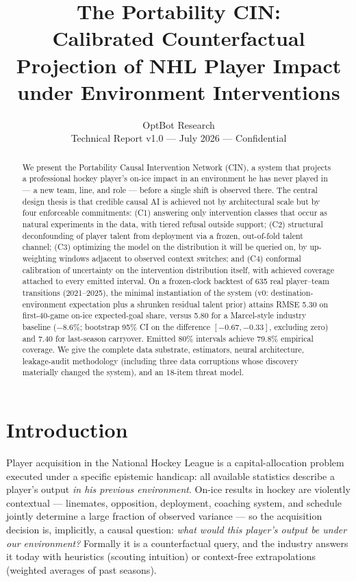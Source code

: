 \documentclass[11pt]{article}
\title{\textbf{The Portability CIN:\\ Calibrated Counterfactual Projection of NHL Player Impact\\ under Environment Interventions}}
\author{OptBot Research \\ \small Technical Report v1.0 --- July 2026 --- Confidential}
\date{}
\begin{document}
\maketitle

\begin{abstract}
\noindent We present the Portability Causal Intervention Network (CIN), a system that projects
a professional hockey player's on-ice impact in an environment he has never played in ---
a new team, line, and role --- before a single shift is observed there. The central design
thesis is that credible causal AI is achieved not by architectural scale but by four
enforceable commitments: (C1) answering only intervention classes that occur as natural
experiments in the data, with tiered refusal outside support; (C2) structural deconfounding
of player talent from deployment via a frozen, out-of-fold talent channel; (C3) optimizing
the model on the distribution it will be queried on, by up-weighting windows adjacent to
observed context switches; and (C4) conformal calibration of uncertainty on the intervention
distribution itself, with achieved coverage attached to every emitted interval. On a
frozen-clock backtest of 635 real player--team transitions (2021--2025), the minimal
instantiation of the system (v0: destination-environment expectation plus a shrunken
residual talent prior) attains RMSE 5.30 on first-40-game on-ice expected-goal share,
versus 5.80 for a Marcel-style industry baseline ($-8.6\%$; bootstrap 95\% CI on the
difference $[-0.67, -0.33]$, excluding zero) and 7.40 for last-season carryover. Emitted
80\% intervals achieve 79.8\% empirical coverage. We give the complete data substrate,
estimators, neural architecture, leakage-audit methodology (including three data corruptions
whose discovery materially changed the system), and an 18-item threat model.
\end{abstract}

\section{Introduction}

Player acquisition in the National Hockey League is a capital-allocation problem executed
under a specific epistemic handicap: all available statistics describe a player's output
\emph{in his previous environment}. On-ice results in hockey are violently contextual ---
linemates, opposition, deployment, coaching system, and schedule jointly determine a large
fraction of observed variance --- so the acquisition decision is, implicitly, a causal
question: \emph{what would this player's output be under our environment?} Formally it is a
counterfactual query, and the industry answers it today with heuristics (scouting intuition)
or context-free extrapolations (weighted averages of past seasons).
\end{document}
